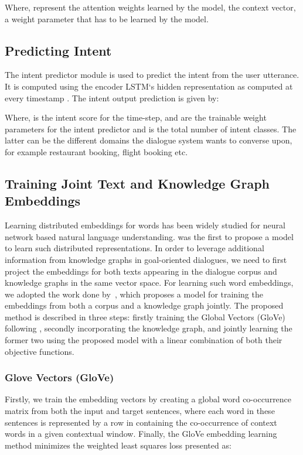 \documentclass[runningheads]{llncs}
\begin{document}
\noindent
Where,  represent the attention weights learned by the model,  the context vector,  a weight parameter that has to be learned by the model.


\subsection{Predicting Intent}

The intent predictor module is used to predict the intent from the user utterance. It is computed using the encoder LSTM`s hidden representation  as computed at every timestamp .
\noindent
The intent output prediction is given by:



\noindent
Where,  is the intent score  for the  time-step,  and  are the trainable weight parameters for the intent predictor and  is the total number of intent classes. The latter can be the different domains the dialogue system wants to converse upon, for example restaurant booking, flight booking etc.

\subsection{Training Joint Text and Knowledge Graph Embeddings}
Learning distributed embeddings for words has been widely studied for neural network based natural language understanding. \cite{mikolov2013distributed} was the first to propose a model to learn such distributed representations. In order to leverage additional information from knowledge graphs in goal-oriented dialogues, we need to first project the embeddings for both texts appearing in the dialogue corpus and knowledge graphs in the same vector space.
For learning such word embeddings, we adopted the work done by~\cite{Alsuhaibani2018}, which proposes a model for training the embeddings from both a corpus and a knowledge graph jointly. The proposed method is described in three steps: firstly training the Global Vectors (GloVe) following \cite{pennington2014}, secondly incorporating the knowledge graph, and jointly learning the former two using the proposed model with a linear combination of both their objective functions.
\subsubsection{Glove Vectors (GloVe)}
Firstly, we train the embedding vectors by creating a global word co-occurrence matrix  from both the input and target sentences, where each word in these sentences is represented by a row in  containing the co-occurrence of context words in a given contextual window. Finally, the GloVe embedding learning method minimizes the weighted least squares loss presented as:
\end{document}
